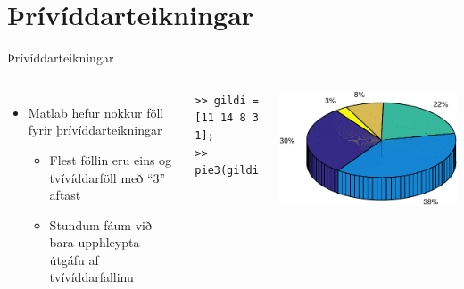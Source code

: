 \documentclass{beamer}
\begin{document}
\section{Þrívíddarteikningar}

\begin{frame}[fragile]{Þrívíddarteikningar}
\begin{columns}
\begin{itemize}
 \item Matlab hefur nokkur föll fyrir þrívíddarteikningar
 \begin{itemize}
  \item Flest föllin eru eins og tvívíddarföll með ``3'' aftast
  \item Stundum fáum við bara upphleypta útgáfu af tvívíddarfallinu
 \end{itemize}
\end{itemize}
\begin{verbatim}
>> gildi = [11 14 8 3 1];
>> pie3(gildi)
\end{verbatim}

\includegraphics[width=\linewidth]{Pics/3dpie}
\end{columns}
\end{frame}
\end{document}
